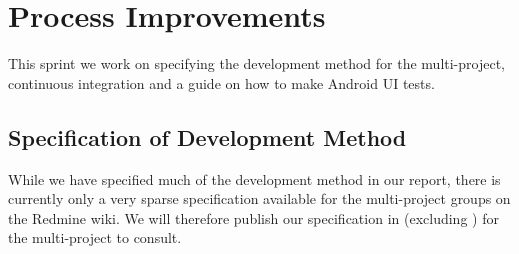 \chapter{Process Improvements}
This sprint we work on specifying the development method for the multi-project, continuous integration and a guide on how to make Android UI tests.

\section{Specification of Development Method}
While we have specified much of the development method in our report, there is currently only a very sparse specification available for the multi-project groups on the Redmine wiki. We will therefore publish our specification in  (excluding ) for the multi-project to consult.

